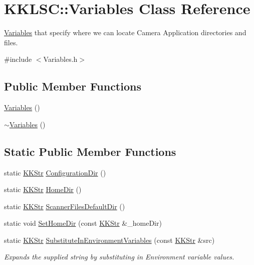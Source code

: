 \hypertarget{class_k_k_l_s_c_1_1_variables}{}\section{K\+K\+L\+SC\+:\+:Variables Class Reference}
\label{class_k_k_l_s_c_1_1_variables}


\hyperlink{class_k_k_l_s_c_1_1_variables}{Variables} that specify where we can locate Camera Application directories and files.  




{\ttfamily \#include $<$Variables.\+h$>$}

\subsection*{Public Member Functions}
\begin{DoxyCompactItemize}
\item 
\hyperlink{class_k_k_l_s_c_1_1_variables_a5610f6bf2bcfb696eb23961de493d563}{Variables} ()
\item 
\hyperlink{class_k_k_l_s_c_1_1_variables_a95870fd79ba168e4742a77b64003ae3b}{$\sim$\+Variables} ()
\end{DoxyCompactItemize}
\subsection*{Static Public Member Functions}
\begin{DoxyCompactItemize}
\item 
static \hyperlink{class_k_k_b_1_1_k_k_str}{K\+K\+Str} \hyperlink{class_k_k_l_s_c_1_1_variables_a35ee35e0d75cfa6ea86eb6e2300bfa9a}{Configuration\+Dir} ()
\item 
static \hyperlink{class_k_k_b_1_1_k_k_str}{K\+K\+Str} \hyperlink{class_k_k_l_s_c_1_1_variables_a14411ff6b8df71995b4bec024bc5a69f}{Home\+Dir} ()
\item 
static \hyperlink{class_k_k_b_1_1_k_k_str}{K\+K\+Str} \hyperlink{class_k_k_l_s_c_1_1_variables_afbbd0c1f1fab02ab3298636acc56451c}{Scanner\+Files\+Default\+Dir} ()
\item 
static void \hyperlink{class_k_k_l_s_c_1_1_variables_a1af5b008a3b6818864d2e1d978c1c95c}{Set\+Home\+Dir} (const \hyperlink{class_k_k_b_1_1_k_k_str}{K\+K\+Str} \&\+\_\+home\+Dir)
\item 
static \hyperlink{class_k_k_b_1_1_k_k_str}{K\+K\+Str} \hyperlink{class_k_k_l_s_c_1_1_variables_a2a4421ed982b109a81db57a937b3f531}{Substitute\+In\+Environment\+Variables} (const \hyperlink{class_k_k_b_1_1_k_k_str}{K\+K\+Str} \&src)
\begin{DoxyCompactList}\small\item\em Expands the supplied string by substituting in Environment variable values. \end{DoxyCompactList}\end{DoxyCompactItemize}


